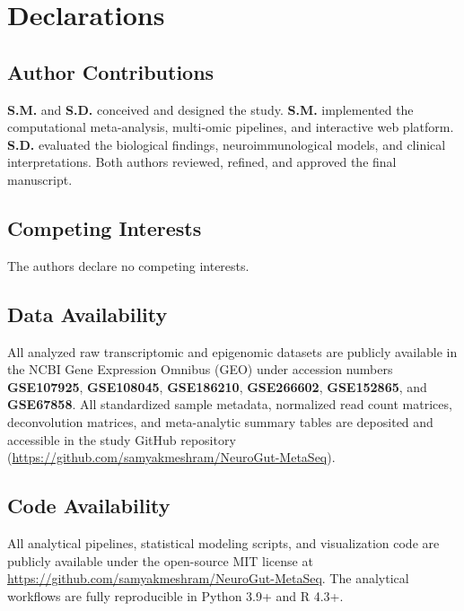 \documentclass[10pt,a4paper]{article}
\begin{document}
\vspace{1.5em}
\section*{Declarations}

\subsection*{Author Contributions}
\textbf{S.M.} and \textbf{S.D.} conceived and designed the study. \textbf{S.M.} implemented the computational meta-analysis, multi-omic pipelines, and interactive web platform. \textbf{S.D.} evaluated the biological findings, neuroimmunological models, and clinical interpretations. Both authors reviewed, refined, and approved the final manuscript.



\subsection*{Competing Interests}
The authors declare no competing interests.

\subsection*{Data Availability}
All analyzed raw transcriptomic and epigenomic datasets are publicly available in the NCBI Gene Expression Omnibus (GEO) under accession numbers \textbf{GSE107925}, \textbf{GSE108045}, \textbf{GSE186210}, \textbf{GSE266602}, \textbf{GSE152865}, and \textbf{GSE67858}. All standardized sample metadata, normalized read count matrices, deconvolution matrices, and meta-analytic summary tables are deposited and accessible in the study GitHub repository (\url{https://github.com/samyakmeshram/NeuroGut-MetaSeq}).

\subsection*{Code Availability}
All analytical pipelines, statistical modeling scripts, and visualization code are publicly available under the open-source MIT license at \url{https://github.com/samyakmeshram/NeuroGut-MetaSeq}. The analytical workflows are fully reproducible in Python 3.9+ and R 4.3+.

\vspace{1.8em}


\end{document}
